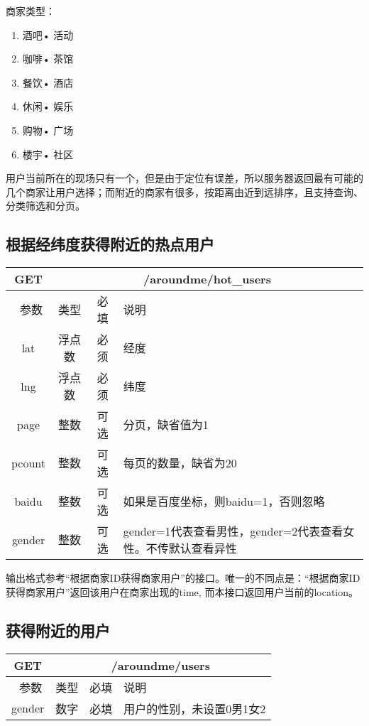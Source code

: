\documentclass[cs4size]{ctexartutf8}
\begin{document}
商家类型：
\begin{enumerate}
\item 酒吧• 活动
\item 咖啡• 茶馆   
\item 餐饮• 酒店
\item 休闲• 娱乐
\item 购物• 广场
\item 楼宇• 社区
\end{enumerate}


用户当前所在的现场只有一个，但是由于定位有误差，所以服务器返回最有可能的几个商家让用户选择；而附近的商家有很多，按距离由近到远排序，且支持查询、分类筛选和分页。


\subsection{根据经纬度获得附近的热点用户}

\begin{table}[H]
   \begin{center}
\begin{tabular}{|c|c|c|p{12cm}|}
\hline
GET & \multicolumn{3}{|c|}{/aroundme/hot\_users} \\
\hline\hline
 \  参数  & 类型 & 必填 &  说明  \\
\hline
 lat  & 浮点数 & 必须 & 经度\\
\hline
 lng  &  浮点数 & 必须 & 纬度\\ 
  \hline
 page  & 整数 & 可选 & 分页，缺省值为1\\ 
 \hline
 pcount  & 整数 & 可选 & 每页的数量，缺省为20\\ 
\hline
 baidu  & 整数 & 可选 & 如果是百度坐标，则baidu=1，否则忽略\\  
 \hline
 gender  & 整数 & 可选 & gender=1代表查看男性，gender=2代表查看女性。不传默认查看异性\\  
\hline
\end{tabular}
   \end{center}
\end{table}

输出格式参考“根据商家ID获得商家用户”的接口。唯一的不同点是：“根据商家ID获得商家用户”返回该用户在商家出现的time, 而本接口返回用户当前的location。




\subsection{获得附近的用户}

\begin{table}[H]
   \begin{center}
\begin{tabular}{|c|c|c|p{12cm}|}
\hline
GET & \multicolumn{3}{|c|}{/aroundme/users} \\
\hline\hline
 \  参数  & 类型 & 必填 &  说明  \\
 \hline
 gender  & 数字 & 必填 &  用户的性别，未设置0男1女2\\
\hline
\end{tabular}
   \end{center}
\end{table}
\end{document}
